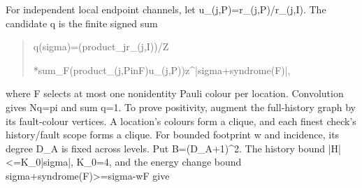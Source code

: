 \documentclass[
]{article}
\begin{document}
For independent local endpoint channels, let
u\allowbreak{}\_\allowbreak{}(\allowbreak{}j\allowbreak{},\allowbreak{}P\allowbreak{})\allowbreak{}=\allowbreak{}r\allowbreak{}\_\allowbreak{}(\allowbreak{}j\allowbreak{},\allowbreak{}P\allowbreak{})\allowbreak{}/\allowbreak{}r\allowbreak{}\_\allowbreak{}(\allowbreak{}j\allowbreak{},\allowbreak{}I\allowbreak{})\allowbreak{}.
The candidate q is the finite signed sum

\begin{quote}\small\ttfamily\raggedright\setlength{\parskip}{0pt}
\noindent q\allowbreak{}(\allowbreak{}s\allowbreak{}i\allowbreak{}g\allowbreak{}m\allowbreak{}a\allowbreak{})\allowbreak{}=\allowbreak{}(\allowbreak{}p\allowbreak{}r\allowbreak{}o\allowbreak{}d\allowbreak{}u\allowbreak{}c\allowbreak{}t\allowbreak{}\_\allowbreak{}j\allowbreak{}\hspace*{0.525em}\allowbreak{}r\allowbreak{}\_\allowbreak{}(\allowbreak{}j\allowbreak{},\allowbreak{}I\allowbreak{})\allowbreak{})\allowbreak{}/\allowbreak{}Z\par
\noindent \hspace*{0.525em}\allowbreak{}\hspace*{0.525em}\allowbreak{}\hspace*{0.525em}\allowbreak{}*\allowbreak{}\hspace*{0.525em}\allowbreak{}s\allowbreak{}u\allowbreak{}m\allowbreak{}\_\allowbreak{}F\allowbreak{}\hspace*{0.525em}\allowbreak{}(\allowbreak{}p\allowbreak{}r\allowbreak{}o\allowbreak{}d\allowbreak{}u\allowbreak{}c\allowbreak{}t\allowbreak{}\_\allowbreak{}(\allowbreak{}j\allowbreak{},\allowbreak{}P\allowbreak{}\hspace*{0.525em}\allowbreak{}i\allowbreak{}n\allowbreak{}\hspace*{0.525em}\allowbreak{}F\allowbreak{})\allowbreak{}\hspace*{0.525em}\allowbreak{}u\allowbreak{}\_\allowbreak{}(\allowbreak{}j\allowbreak{},\allowbreak{}P\allowbreak{})\allowbreak{})\allowbreak{}\hspace*{0.525em}\allowbreak{}z\allowbreak{}\^{}\allowbreak{}|\allowbreak{}s\allowbreak{}i\allowbreak{}g\allowbreak{}m\allowbreak{}a\allowbreak{}+\allowbreak{}s\allowbreak{}y\allowbreak{}n\allowbreak{}d\allowbreak{}r\allowbreak{}o\allowbreak{}m\allowbreak{}e\allowbreak{}(\allowbreak{}F\allowbreak{})\allowbreak{}|\allowbreak{},\par
\end{quote}

where F selects at most one nonidentity Pauli colour per location.
Convolution gives Nq=pi and sum q=1. To prove positivity, augment the
full-history graph by its fault-colour vertices. A location's colours
form a clique, and each finest check's history/fault scope forms a
clique. For bounded footprint w and incidence, its degree D\_A is fixed
across levels. Put B=(D\_A+1)\^{}2. The history bound
|\allowbreak{}H\allowbreak{}|\allowbreak{}<\allowbreak{}=\allowbreak{}K\allowbreak{}\_\allowbreak{}0\allowbreak{}|\allowbreak{}s\allowbreak{}i\allowbreak{}g\allowbreak{}m\allowbreak{}a\allowbreak{}|\allowbreak{},
K\_0=4, and the energy change bound
\textbar sigma+syndrome(F)\textbar\textgreater=\textbar sigma\textbar-w\textbar F\textbar{}
give
\end{document}
